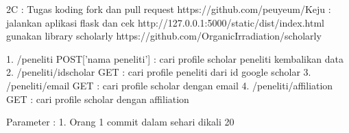 2C :
Tugas koding fork dan pull request https://github.com/peuyeum/Keju :
jalankan aplikasi flask dan cek http://127.0.0.1:5000/static/dist/index.html
gunakan library scholarly https://github.com/OrganicIrradiation/scholarly

1. /peneliti POST['nama peneliti'] : cari profile scholar peneliti kembalikan data
2. /peneliti/{idscholar} GET : cari profile peneliti dari id google scholar
3. /peneliti/{email} GET : cari profile scholar dengan email
4. /peneliti/{affiliation} GET : cari profile scholar dengan affiliation


Parameter :
1. Orang 1 commit dalam sehari dikali 20